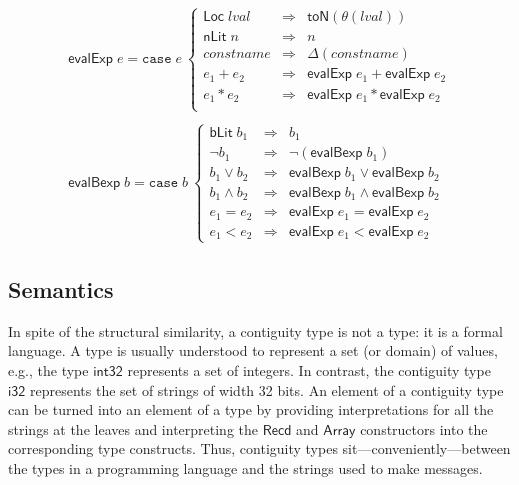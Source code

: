 \documentclass[svgnames]{llncs}
\newcommand{\eg}{e.g.}
\newcommand{\konst}[1]{\ensuremath{\mathsf{#1}}}
\newcommand{\lval}{\ensuremath{\mathit{lval}}}
\begin{document}
\[
\begin{array}{l}
\konst{evalExp} \; e =
\mathtt{case}\; e\
 \left\{
 \begin{array}{lcl}
    \konst{Loc}\; \lval & \Rightarrow & \konst{toN}(\theta(\lval)) \\
    \konst{nLit}\; n & \Rightarrow & n  \\
    \mathit{constname} & \Rightarrow & \Delta(\mathit{constname})  \\
    e_1 + e_2 & \Rightarrow & \konst{evalExp}\; e_1 + \konst{evalExp}\; e_2  \\
    e_1 * e_2 & \Rightarrow & \konst{evalExp}\; e_1 * \konst{evalExp}\; e_2  \\
  \end{array}
 \right.
 \\ \\
\konst{evalBexp} \; b =
\mathtt{case}\; b\
 \left\{
 \begin{array}{lcl}
    \konst{bLit}\; b_1 & \Rightarrow & b_1 \\
    \neg b_1 & \Rightarrow & \neg(\konst{evalBexp} \; b_1)  \\
    b_1 \lor b_2 & \Rightarrow & \konst{evalBexp} \;b_1 \lor \konst{evalBexp} \;b_2   \\
    b_1 \land b_2 & \Rightarrow & \konst{evalBexp} \;b_1 \land \konst{evalBexp} \;b_2   \\
    e_1 = e_2 & \Rightarrow & \konst{evalExp} \;e_1 = \konst{evalExp} \;e_2   \\
    e_1 < e_2 & \Rightarrow & \konst{evalExp} \;e_1 < \konst{evalExp} \;e_2
  \end{array}
 \right.

\end{array}
\]




\subsection{Semantics}

In spite of the structural similarity, a contiguity type is not a
type: it is a formal language. A type is usually understood to
represent a set (or domain) of values, \eg, the type \konst{int32}
represents a set of integers. In contrast, the contiguity type
\konst{i32} represents the set of strings of width 32 bits. An element
of a contiguity type can be turned into an element of a type by
providing interpretations for all the strings at the leaves and
interpreting the \konst{Recd} and \konst{Array} constructors into the
corresponding type constructs. Thus, contiguity types
sit---conveniently---between the types in a programming language and
the strings used to make messages.
\end{document}
